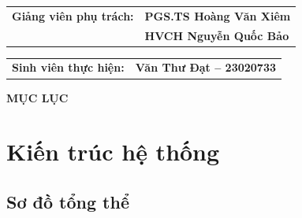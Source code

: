 \documentclass[13pt,a4paper]{extarticle}
\begin{document}
\vspace{1.8cm}




\noindent
\hspace*{2cm}%
\begin{tabular}{
    @{}
    >{\bfseries}p{5cm}
    p{7cm}
    @{}
}
Giảng viên phụ trách:
&
\textbf{PGS.TS Hoàng Văn Xiêm}
\\
&
\textbf{HVCH Nguyễn Quốc Bảo}\\
\end{tabular}

\vspace{2cm}


\noindent
\hspace*{2cm}%
\begin{tabular}{
    @{}
    >{\bfseries}p{5cm}
    p{7cm}
    @{}
}
Sinh viên thực hiện:
&
\textbf{Văn Thư Đạt -- 23020733}
\end{tabular}



\newpage
\pagestyle{plain}

\setcounter{tocdepth}{2}

\begin{center}
    {\bfseries\Large MỤC LỤC}
\end{center}

\vspace{0.4cm}

\begingroup
\small
\setlength{\parskip}{0pt}

\makeatletter
{}
\makeatother

\endgroup

\newpage


\Needspace{17cm}
\section{Kiến trúc hệ thống}

\subsection{Sơ đồ tổng thể}
\end{document}
